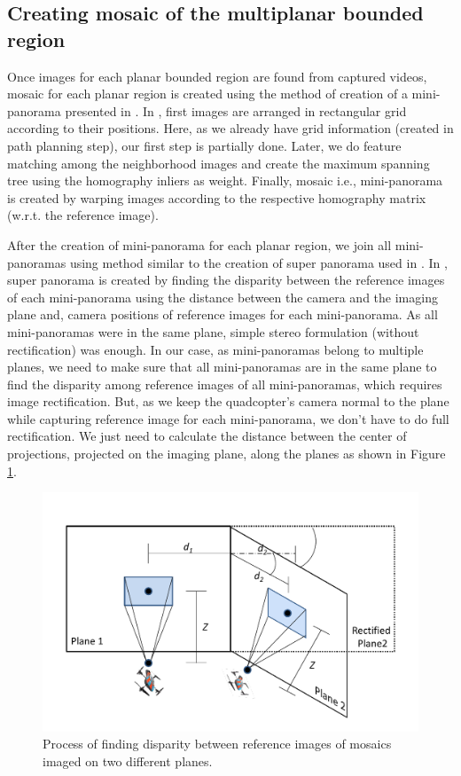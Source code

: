 \subsection{Creating mosaic of the multiplanar bounded region}
Once images for each planar bounded region are found from captured
videos, mosaic for each planar region is created using the method of creation of
a mini-panorama presented in \cite{Prasad16}. In \cite{Prasad16}, first images
are arranged in rectangular grid according to their positions. Here, as we already have grid
information (created in path planning step), our first step is partially done.
Later, we do feature matching among the neighborhood images and create the
maximum spanning tree using  the homography inliers as weight. Finally, mosaic
i.e., mini-panorama is created by warping images according to the respective
homography matrix (w.r.t. the  reference image).

After the creation of mini-panorama for each planar region, we join all
mini-panoramas using method similar to the creation of super panorama used in
\cite{Prasad16}. In \cite{Prasad16}, super panorama is created by finding the
disparity between the reference images of each mini-panorama using the distance
between the camera and the imaging plane and, camera positions of reference
images for each mini-panorama. As all mini-panoramas were in the same plane,
simple stereo formulation (without rectification) was enough. In our case, as
mini-panoramas belong to multiple planes, we need to make sure that all
mini-panoramas are in the same plane to find the disparity among reference images of
 all mini-panoramas, which requires image rectification. But, as we keep the
 quadcopter's camera normal to the plane while capturing reference image for each
 mini-panorama, we don't have to do full rectification.
 We just need to calculate the distance between the center of projections, projected on the imaging plane, 
 along the planes as shown in Figure \ref{fig:multiplanarMosaic}.

\begin{figure}[ht!]
\centering
\includegraphics[width=\linewidth]{figures/multiplanar/MultiplanarMosaic}
\caption[Super panorama for multiplanar scene]{Process of finding disparity
between reference images of mosaics imaged on two different planes.}
\label{fig:multiplanarMosaic}
\end{figure}

